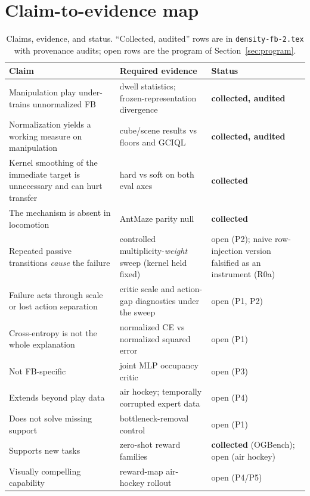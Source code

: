 \documentclass{article}
\begin{document}
\section{Claim-to-evidence map}
\label{sec:claims}

\begin{table}[h]
\centering
\small
\begin{tabular}{p{}p{}l}
\toprule
Claim & Required evidence & Status \\
\midrule
Manipulation play under-trains unnormalized FB & dwell statistics; frozen-representation divergence & \textbf{collected, audited} \\
Normalization yields a working measure on manipulation & cube/scene results vs floors and GCIQL & \textbf{collected, audited} \\
Kernel smoothing of the immediate target is unnecessary and can hurt transfer & hard vs soft on both eval axes & \textbf{collected} \\
The mechanism is absent in locomotion & AntMaze parity null & \textbf{collected} \\
Repeated passive transitions \emph{cause} the failure & controlled multiplicity-\emph{weight} sweep (kernel held fixed) & open (P2); naive row-injection version falsified as an instrument (R0a) \\
Failure acts through scale or lost action separation & critic scale and action-gap diagnostics under the sweep & open (P1, P2) \\
Cross-entropy is not the whole explanation & normalized CE vs normalized squared error & open (P1) \\
Not FB-specific & joint MLP occupancy critic & open (P3) \\
Extends beyond play data & air hockey; temporally corrupted expert data & open (P4) \\
Does not solve missing support & bottleneck-removal control & open (P1) \\
Supports new tasks & zero-shot reward families & \textbf{collected} (OGBench); open (air hockey) \\
Visually compelling capability & reward-map air-hockey rollout & open (P4/P5) \\
\bottomrule
\end{tabular}
\caption{Claims, evidence, and status. ``Collected, audited'' rows are in \texttt{density-fb-2.tex} with provenance audits; open rows are the program of Section~\ref{sec:program}.}
\end{table}
\end{document}
